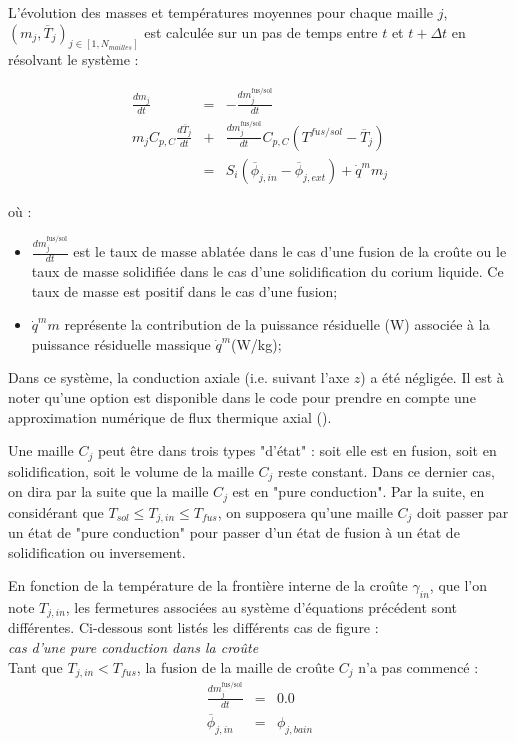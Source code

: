 \documentclass[12pt,a4paper,lmag,nt,article,french]{docDTN}
\begin{document}
L'évolution des masses et températures moyennes pour chaque maille $j$, $\left(m_{j}, \overline{T}_{j}\right)_{j\in[1, N_{mailles}]}$ est calculée sur un pas de temps entre $t$ et $t+\Delta t$ en résolvant le système :

\begin{eqnarray*}
\frac{dm_{j}}{dt} &=& - \frac{dm_{j}^\text{fus/sol}}{dt} \\ 
m_{j} C_{p,C} \frac{d \overline{T}_{j}}{dt} &+& \frac{dm_{j}^\text{fus/sol}}{dt}C_{p,C} \left(T^{fus/sol} - \overline{T}_{j}\right) \\ &=& S_i\left(\overline{\phi}_{j,in} - \overline{\phi}_{j,ext}\right) + \dot{q}^m m_{j}
\end{eqnarray*}

où :

\begin{itemize}
 \item $\frac{dm_j^\text{fus/sol}}{dt}$ est le taux de masse ablatée dans le cas d'une fusion de la croûte ou le taux de masse solidifiée dans le cas d'une solidification du corium liquide. Ce taux de masse est positif dans le cas d'une fusion;
 \item $\dot{q}^m m$ représente la contribution de la puissance résiduelle (W) associée à la puissance résiduelle massique $\dot{q}^m$(W/kg);
\end{itemize}
Dans ce système, la conduction axiale (i.e. suivant l'axe $z$) a été négligée. Il est à noter qu'une option est disponible dans le code pour prendre en compte une approximation numérique de flux thermique axial (\cite{NENE2018}). 

Une maille $C_j$ peut être dans trois types "d'état" : soit elle est en fusion, soit en solidification, soit le volume de la maille $C_j$ reste constant. Dans ce dernier cas, on dira par la suite que la maille $C_j$ est en "pure conduction". Par la suite, en considérant que $T_{sol}\leq T_{j,in}\leq T_{fus}$, on supposera qu'une maille $C_j$ doit passer par un état de "pure conduction" pour passer d'un état de fusion à un état de solidification ou inversement.

En fonction de la température de la frontière interne de la croûte $\gamma_{in}$, que l'on note $T_{j,in}$, les fermetures associées au système d'équations précédent sont différentes. Ci-dessous sont listés les différents cas de figure :\\

{\it cas d'une pure conduction dans la croûte}\\
Tant que $T_{j,in}<T_{fus}$, la fusion de la maille de croûte $C_j$ n'a pas commencé :
\begin{eqnarray*}
\frac{dm_j^\text{fus/sol}}{dt} &=& 0.0 \\
\overline{\phi}_{j,in} &=& \phi_{j,bain}
\end{eqnarray*}
\end{document}
